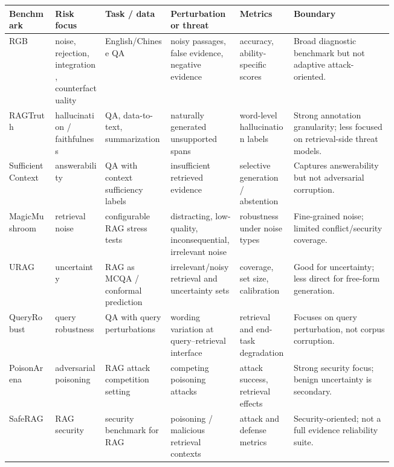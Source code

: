 \documentclass[11pt]{article}
\begin{document}
\begin{table}[t]
\centering
\scriptsize
\renewcommand{\arraystretch}{0.95}
\begin{tabularx}{\linewidth}{>{\raggedright\arraybackslash}p{0.12\linewidth}>{\raggedright\arraybackslash}p{0.13\linewidth}>{\raggedright\arraybackslash}p{0.17\linewidth}>{\raggedright\arraybackslash}p{0.18\linewidth}>{\raggedright\arraybackslash}p{0.14\linewidth}X}
\toprule
\textbf{Benchmark} & \textbf{Risk focus} & \textbf{Task / data} & \textbf{Perturbation or threat} & \textbf{Metrics} & \textbf{Boundary} \\
\midrule
RGB \citep{rgb2023} & noise, rejection, integration, counterfactuality & English/Chinese QA & noisy passages, false evidence, negative evidence & accuracy, ability-specific scores & Broad diagnostic benchmark but not adaptive attack-oriented. \\
RAGTruth \citep{ragTruth2024} & hallucination / faithfulness & QA, data-to-text, summarization & naturally generated unsupported spans & word-level hallucination labels & Strong annotation granularity; less focused on retrieval-side threat models. \\
Sufficient Context \citep{sufficientContext2024} & answerability & QA with context sufficiency labels & insufficient retrieved evidence & selective generation / abstention & Captures answerability but not adversarial corruption. \\
MagicMushroom \citep{rrag027} & retrieval noise & configurable RAG stress tests & distracting, low-quality, inconsequential, irrelevant noise & robustness under noise types & Fine-grained noise; limited conflict/security coverage. \\
URAG \citep{rrag001} & uncertainty & RAG as MCQA / conformal prediction & irrelevant/noisy retrieval and uncertainty sets & coverage, set size, calibration & Good for uncertainty; less direct for free-form generation. \\
QueryRobust \citep{queryRobustness2025} & query robustness & QA with query perturbations & wording variation at query--retrieval interface & retrieval and end-task degradation & Focuses on query perturbation, not corpus corruption. \\
PoisonArena \citep{rrag023} & adversarial poisoning & RAG attack competition setting & competing poisoning attacks & attack success, retrieval effects & Strong security focus; benign uncertainty is secondary. \\
SafeRAG \citep{rrag019} & RAG security & security benchmark for RAG & poisoning / malicious retrieval contexts & attack and defense metrics & Security-oriented; not a full evidence reliability suite. \\

\end{tabularx}
\end{table}
\end{document}
